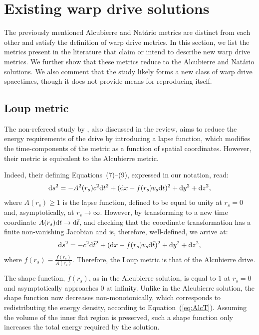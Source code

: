 \documentclass[10pt]{iopart}
\begin{document}
\newpage 

\appendix
\section{Existing warp drive solutions}
\label{sec:AppA}
The previously mentioned Alcubierre and Natário metrics are distinct from each other and satisfy the definition of warp drive metrics. In this section, we list the metrics present in the literature that claim or intend to describe new warp drive metrics. We further show that these metrics reduce to the Alcubierre and Natário solutions. We also comment that  the \cite{Lentz2020} study likely forms a new class of warp drive spacetimes, though it does not provide means for reproducing itself.


\subsection{Loup metric}

The non-refereed study by \cite{Loup2001}, also discussed in the \cite{Alcubierre2017} review, aims to reduce the energy requirements of the \cite{Alcubierre1994} drive by introducing a lapse function, which modifies the time-components of the metric as a function of spatial coordinates. However, their metric is equivalent to the Alcubierre metric.

Indeed, their defining Equations~(7)--(9), expressed in our notation, read:
\begin{equation}
    {\rm d}s^2=- A^2(r_s) c^2 {\rm d} t^2 + ({\rm d}x-f(r_s)v_s {\rm d}t)^2+{\rm d}y^2 + {\rm d}z^2,
    \label{eq:Loup}
\end{equation}
where $A(r_s)\geq1$ is the lapse function, defined to be equal to unity at $r_s=0$ and, asymptotically, at $r_s\rightarrow \infty$. However, by transforming to a new time coordinate $A(r_s){\rm d} t \rightarrow {\rm d}\bar{t}$, and checking that the coordinate transformation has a finite non-vanishing Jacobian and is, therefore, well-defined, we arrive at:
\begin{equation}
    {\rm d}s^2=- c^2 {\rm d} \bar{t}^2 + ({\rm d}x-\bar{f}(r_s) v_s {\rm d}\bar{t})^2+{\rm d}y^2 + {\rm d}z^2,
    \label{eq:Loup2}
\end{equation}
where  $\bar{f}(r_s)\equiv \frac{f(r_s)}{A(r_s)}$. Therefore, the Loup metric is that of the Alcubierre drive.

The shape function, $\bar{f}(r_s)$, as in the Alcubierre solution, is equal to $1$ at $r_s=0$ and asymptotically approaches $0$ at infinity. Unlike in the Alcubierre solution, the shape function now decreases non-monotonically, which corresponds to redistributing the energy density, according to Equation~(\ref{eq:AlcT}). Assuming the volume of the inner flat region is preserved, such a shape function only increases the total energy required by the solution.
\end{document}
